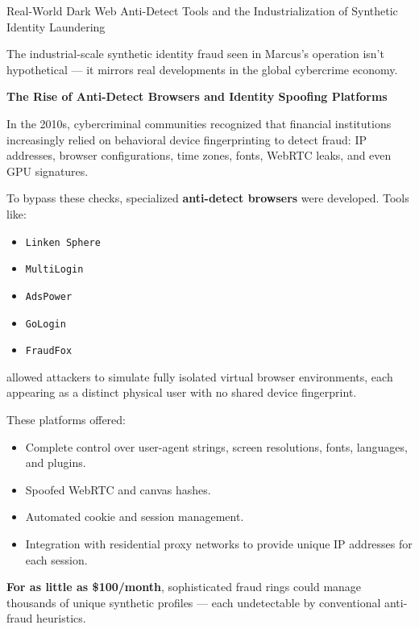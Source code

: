 \begin{HistoricalSidebar}{Real-World Dark Web Anti-Detect Tools and the Industrialization of Synthetic Identity Laundering}

    The industrial-scale synthetic identity fraud seen in Marcus's operation isn’t hypothetical --- it mirrors real developments in the global cybercrime economy.
    
    \medskip
    
    \textbf{The Rise of Anti-Detect Browsers and Identity Spoofing Platforms}
    
    In the 2010s, cybercriminal communities recognized that financial institutions increasingly relied on behavioral device fingerprinting to detect fraud: IP addresses, browser configurations, time zones, fonts, WebRTC leaks, and even GPU signatures.
    
    \medskip
    
    To bypass these checks, specialized \textbf{anti-detect browsers} were developed. Tools like:
    
    \begin{itemize}
        \item \texttt{Linken Sphere}
        \item \texttt{MultiLogin}
        \item \texttt{AdsPower}
        \item \texttt{GoLogin}
        \item \texttt{FraudFox}
    \end{itemize}
    
    allowed attackers to simulate fully isolated virtual browser environments, each appearing as a distinct physical user with no shared device fingerprint.
    
    \medskip
    
    These platforms offered:
    
    \begin{itemize}
        \item Complete control over user-agent strings, screen resolutions, fonts, languages, and plugins.
        \item Spoofed WebRTC and canvas hashes.
        \item Automated cookie and session management.
        \item Integration with residential proxy networks to provide unique IP addresses for each session.
    \end{itemize}
    
    \textbf{For as little as \$100/month}, sophisticated fraud rings could manage thousands of unique synthetic profiles — each undetectable by conventional anti-fraud heuristics.
    

\end{HistoricalSidebar}
